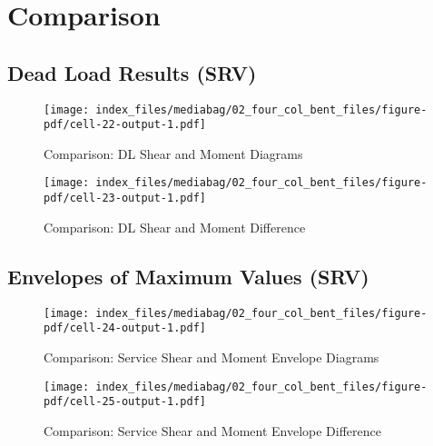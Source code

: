 \documentclass[
  letterpaper,
  DIV=11,
  numbers=noendperiod]{scrreprt}
\begin{document}
\section{Comparison}\label{comparison}

\subsection{Dead Load Results (SRV)}\label{dead-load-results-srv-1}

\begin{figure}[H]

{\centering \texttt{[image: index\_files/mediabag/02\_four\_col\_bent\_files/figure-pdf/cell-22-output-1.pdf]}

}

\caption{Comparison: DL Shear and Moment Diagrams}

\end{figure}%

\begin{figure}[H]

{\centering \texttt{[image: index\_files/mediabag/02\_four\_col\_bent\_files/figure-pdf/cell-23-output-1.pdf]}

}

\caption{Comparison: DL Shear and Moment Difference}

\end{figure}%

\subsection{Envelopes of Maximum Values
(SRV)}\label{envelopes-of-maximum-values-srv-2}

\begin{figure}[H]

{\centering \texttt{[image: index\_files/mediabag/02\_four\_col\_bent\_files/figure-pdf/cell-24-output-1.pdf]}

}

\caption{Comparison: Service Shear and Moment Envelope Diagrams}

\end{figure}%

\begin{figure}[H]

{\centering \texttt{[image: index\_files/mediabag/02\_four\_col\_bent\_files/figure-pdf/cell-25-output-1.pdf]}

}

\caption{Comparison: Service Shear and Moment Envelope Difference}

\end{figure}%
\end{document}

